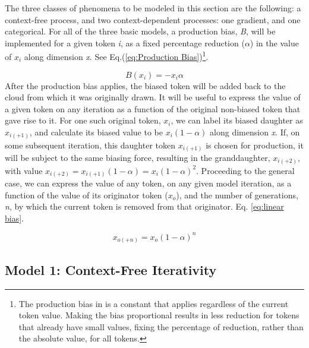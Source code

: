 The three classes of phenomena to be modeled in this section are the
following: a context-free process, and two context-dependent processes:
one gradient, and one categorical. For all of the three basic models,
a production bias, \emph{B}, will be implemented for a given token
\emph{i}, as a fixed percentage reduction ($\alpha$) in the value
of \emph{$x_{i}$} along dimension \emph{x}. See Eq.(\ref{eq:Production Bias})\footnote{The production bias in \citet{Pierrehumbert2000} is a constant that
applies regardless of the current token value. Making the bias proportional
results in less reduction for tokens that already have small values,
fixing the percentage of reduction, rather than the absolute value,
for all tokens.}. 

\begin{equation}
B(x_{i})=-x_{i}\alpha\label{eq:Production Bias}
\end{equation}
After the production bias applies, the biased token will be added
back to the cloud from which it was originally drawn. It will be useful
to express the value of a given token on any iteration as a function
of the original non-biased token that gave rise to it. For one such
original token, $x_{i}$, we can label its biased daughter as $x_{i(+1)}$,
and calculate its biased value to be $x_{i}\left(1-\alpha\right)$
along dimension \emph{x}. If, on some subsequent iteration, this daughter
token $x_{i(+1)}$ is chosen for production, it will be subject to
the same biasing force, resulting in the granddaughter, $x_{i(+2)}$,
with value $x_{i(+2)}=x_{i(+1)}\left(1-\alpha\right)=x_{i}\left(1-\alpha\right)^{2}$.
Proceeding to the general case, we can express the value of any token,
on any given model iteration, as a function of the value of its originator
token ($x_{o}$), and the number of generations, \emph{n}, by which
the current token is removed from that originator. Eq. \ref{eq:linear bias}. 

\begin{equation}
x_{o(+n)}=x_{o}\left(1-\alpha\right)^{n}\label{eq:linear bias}
\end{equation}


\subsection{\label{subsec:Model-1:-Context-Free}Model 1: Context-Free Iterativity}

